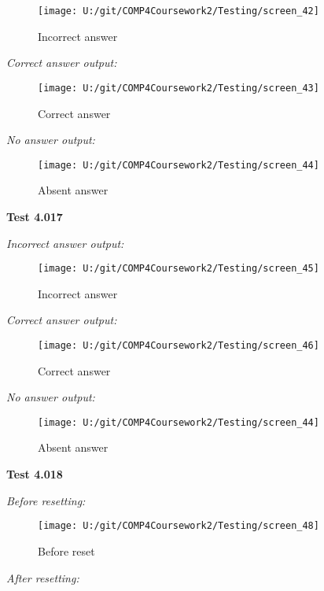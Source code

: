 \begin{figure}[H]
    \label{fig: Second Screen}\caption{Incorrect answer}
    \texttt{[image: U:/git/COMP4Coursework2/Testing/screen\_42]}
\end{figure}

\textit{Correct answer output: }

\begin{figure}[H]
    \label{fig: Second Screen}\caption{Correct answer}
    \texttt{[image: U:/git/COMP4Coursework2/Testing/screen\_43]}
\end{figure}

\textit{No answer output: }

\begin{figure}[H]
    \label{fig: Second Screen}\caption{Absent answer}
    \texttt{[image: U:/git/COMP4Coursework2/Testing/screen\_44]}
\end{figure}

\textbf{Test 4.017}

\textit{Incorrect answer output: }

\begin{figure}[H]
    \label{fig: Second Screen}\caption{Incorrect answer}
    \texttt{[image: U:/git/COMP4Coursework2/Testing/screen\_45]}
\end{figure}

\textit{Correct answer output: }

\begin{figure}[H]
    \label{fig: Second Screen}\caption{Correct answer}
    \texttt{[image: U:/git/COMP4Coursework2/Testing/screen\_46]}
\end{figure}

\textit{No answer output: }

\begin{figure}[H]
    \label{fig: Second Screen}\caption{Absent answer}
    \texttt{[image: U:/git/COMP4Coursework2/Testing/screen\_44]}
\end{figure}

\textbf{Test 4.018}

\textit{Before resetting: }

\begin{figure}[H]
    \label{fig: Second Screen}\caption{Before reset}
    \texttt{[image: U:/git/COMP4Coursework2/Testing/screen\_48]}
\end{figure}

\textit{After resetting: }

